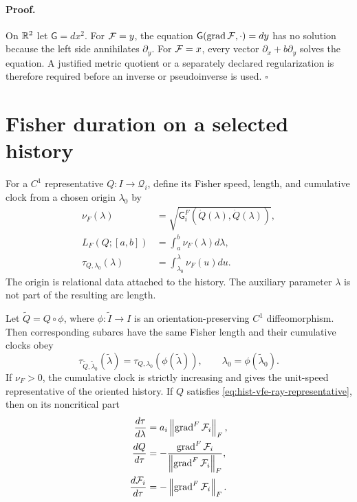 \paragraph{Proof.}
On $\mathbb R^2$ let $\mathsf G=dx^2$.  For $\mathcal F=y$, the equation
$\mathsf G(\operatorname{grad}\mathcal F,\cdot)=dy$ has no solution because
the left side annihilates $\partial_y$.  For $\mathcal F=x$, every vector
$\partial_x+b\partial_y$ solves the equation.  A justified metric quotient
or a separately declared regularization is therefore required before an
inverse or pseudoinverse is used.  $\square$

\section{Fisher duration on a selected history}
\label{sec:hist-fisher-duration}

For a $C^1$ representative $Q:I\to\mathcal Q_i$, define its Fisher speed,
length, and cumulative clock from a chosen origin $\lambda_0$ by
\begin{align}
\nu_F(\lambda)
&=\sqrt{\mathsf G_i^F(\dot Q(\lambda),\dot Q(\lambda))},
\label{eq:hist-fisher-speed}\\
L_F(Q;[a,b])
&=\int_a^b\nu_F(\lambda)d\lambda,
\label{eq:hist-fisher-length}\\
\tau_{Q,\lambda_0}(\lambda)
&=\int_{\lambda_0}^{\lambda}\nu_F(u)du.
\label{eq:hist-cumulative-fisher-clock}
\end{align}
The origin is relational data attached to the history.  The auxiliary
parameter $\lambda$ is not part of the resulting arc length.

Let $\widetilde Q=Q\circ\phi$, where
$\phi:\widetilde I\to I$ is an orientation-preserving $C^1$
diffeomorphism.  Then corresponding subarcs have the same Fisher length and
their cumulative clocks obey
\begin{equation}
\tau_{\widetilde Q,\widetilde\lambda_0}(\widetilde\lambda)
=\tau_{Q,\lambda_0}(\phi(\widetilde\lambda)),
\qquad
\lambda_0=\phi(\widetilde\lambda_0).
\label{eq:hist-clock-reparameterization-law}
\end{equation}
If $\nu_F>0$, the cumulative clock is strictly increasing and gives the
unit-speed representative of the oriented history.  If $Q$ satisfies
\eqref{eq:hist-vfe-ray-representative}, then on its noncritical part
\begin{align}
\frac{d\tau}{d\lambda}
&=a_i\left\|\operatorname{grad}^F\mathcal F_i\right\|_F,
\label{eq:hist-vfe-clock-rate}\\
\frac{dQ}{d\tau}
&=-\frac{\operatorname{grad}^F\mathcal F_i}
{\left\|\operatorname{grad}^F\mathcal F_i\right\|_F},
\label{eq:hist-vfe-unit-tangent}\\
\frac{d\mathcal F_i}{d\tau}
&=-\left\|\operatorname{grad}^F\mathcal F_i\right\|_F.
\label{eq:hist-vfe-dissipation-per-length}
\end{align}


